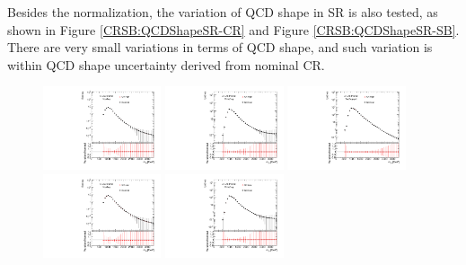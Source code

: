 \clearpage
Besides the normalization, the variation of QCD shape in SR is also tested, as shown in Figure \ref{CRSB:QCDShapeSR-CR} and Figure \ref{CRSB:QCDShapeSR-SB}. There are very small variations in terms of QCD shape, and such variation is within QCD shape uncertainty derived from nominal CR. 

\begin{figure}[htbp!]
\begin{center}
\includegraphics[width=0.31\textwidth,angle=-90]{figures/boosted/Syst_CRSB/CR_High_compare_FourTag_qcd_hh.pdf}
\includegraphics[width=0.31\textwidth,angle=-90]{figures/boosted/Syst_CRSB/CR_High_compare_ThreeTag_qcd_hh.pdf}
\includegraphics[width=0.31\textwidth,angle=-90]{figures/boosted/Syst_CRSB/CR_High_compare_TwoTag_split_qcd_hh.pdf}
\includegraphics[width=0.31\textwidth,angle=-90]{figures/boosted/Syst_CRSB/CR_Low_compare_FourTag_qcd_hh.pdf}
\includegraphics[width=0.31\textwidth,angle=-90]{figures/boosted/Syst_CRSB/CR_Low_compare_ThreeTag_qcd_hh.pdf}

\end{center}
\end{figure}
